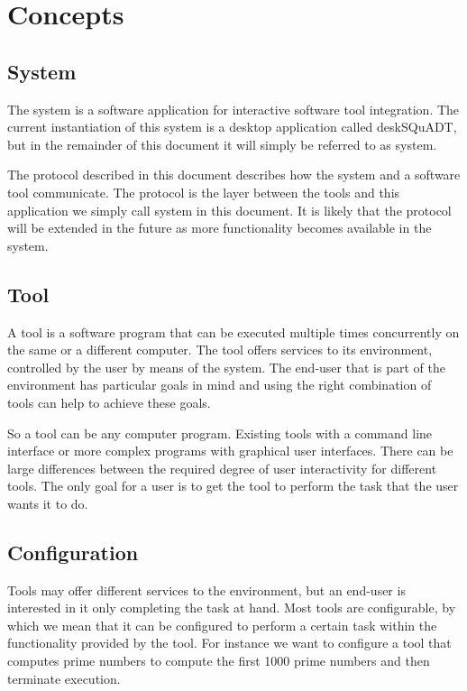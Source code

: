 \documentclass{article}
\begin{document}
 \section{Concepts}

  \subsection{System}

   The system is a software application for interactive software tool
   integration.  The current instantiation of this system is a desktop
   application called deskSQuADT, but in the remainder of this document it will
   simply be referred to as system.

   The protocol described in this document describes how the system and a
   software tool communicate.  The protocol is the layer between the tools and
   this application we simply call system in this document.  It is likely that
   the protocol will be extended in the future as more functionality becomes
   available in the system.
   
  \subsection{Tool}

   A tool is a software program that can be executed multiple times
   concurrently on the same or a different computer. The tool offers services
   to its environment, controlled by the user by means of the system. The
   end-user that is part of the environment has particular goals in mind and
   using the right combination of tools can help to achieve these goals.

   So a tool can be any computer program. Existing tools with a command line
   interface or more complex programs with graphical user interfaces.
   There can be large differences between the required degree of user
   interactivity for different tools. The only goal for a user is to get the
   tool to perform the task that the user wants it to do.

  \subsection{Configuration}

   Tools may offer different services to the environment, but an end-user is
   interested in it only completing the task at hand. Most tools are
   configurable, by which we mean that it can be configured to perform a
   certain task within the functionality provided by the tool. For instance we
   want to configure a tool that computes prime numbers to compute the first
   1000 prime numbers and then terminate execution.
\end{document}
